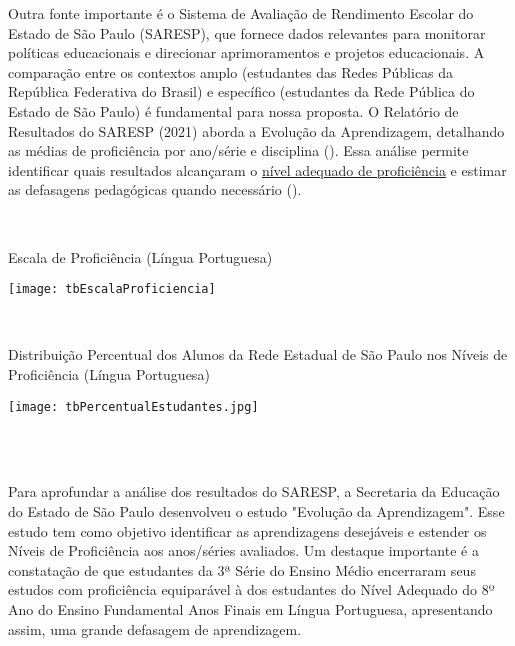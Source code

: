 Outra fonte importante é o Sistema de Avaliação de Rendimento Escolar do Estado de São Paulo (SARESP), que fornece dados relevantes para monitorar políticas educacionais e direcionar aprimoramentos e projetos educacionais. A comparação entre os contextos amplo (estudantes das Redes Públicas da República Federativa do Brasil) e específico (estudantes da Rede Pública do Estado de São Paulo) é fundamental para nossa proposta. O Relatório de Resultados do SARESP (2021) aborda a Evolução da Aprendizagem, detalhando as médias de proficiência por ano/série e disciplina (). Essa análise permite identificar quais resultados alcançaram o \href{https://download.inep.gov.br/publicacoes/institucionais/avaliacoes_e_exames_da_educacao_basica/escalas_de_proficiencia_do_saeb.pdf}{nível adequado de proficiência} e estimar as defasagens pedagógicas quando necessário ().
\\
\begin{itemize}
\\
\begin{table}[!h]
\centering
{}
\caption{Escala de Proficiência (Língua Portuguesa)}%
\label{grph:EscProf}
\texttt{[image: tbEscalaProficiencia]}
\end{table}
\\
\begin{table}[!h]
\centering
{}
\caption{Distribuição Percentual dos Alunos da Rede Estadual de São Paulo nos Níveis de Proficiência (Língua Portuguesa)}%
\label{grph:DistrPerc}
\texttt{[image: tbPercentualEstudantes.jpg]}
\\
\end{table}
\\
\end{itemize}
\\

Para aprofundar a análise dos resultados do SARESP, a Secretaria da Educação do Estado de São Paulo desenvolveu o estudo "Evolução da Aprendizagem". Esse estudo tem como objetivo identificar as aprendizagens desejáveis e estender os Níveis de Proficiência aos anos/séries avaliados. Um destaque importante é a constatação de que estudantes da 3ª Série do Ensino Médio encerraram seus estudos com proficiência equiparável à dos estudantes do Nível Adequado do 8º Ano do Ensino Fundamental Anos Finais em Língua Portuguesa, apresentando assim, uma grande defasagem de aprendizagem.
\\


